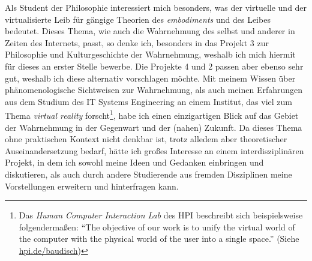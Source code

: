 \documentclass[a4paper]{article}
\begin{document}
Als Student der Philosophie interessiert mich besonders, was der virtuelle und der virtualisierte Leib für gängige Theorien des \emph{embodiments} und des Leibes bedeutet. Dieses Thema, wie auch die Wahrnehmung des selbst und anderer in Zeiten des Internets, passt, so denke ich, besonders in das Projekt 3 zur Philosophie und Kulturgeschichte der Wahrnehmung, weshalb ich mich hiermit für dieses an erster Stelle bewerbe. Die Projekte 4 und 2 passen aber ebenso sehr gut, weshalb ich diese alternativ vorschlagen möchte. Mit meinem Wissen über phänomenologische Sichtweisen zur Wahrnehmung, als auch meinen Erfahrungen aus dem Studium des IT Systems Engineering an einem Institut, das viel zum Thema \emph{virtual reality} forscht\footnote{Das \emph{Human Computer Interaction Lab} des HPI beschreibt sich beispielsweise folgendermaßen: "`The objective of our work is to unify the virtual world of the computer with the physical world of the user into a single space."' (Siehe \url{hpi.de/baudisch})}, habe ich einen einzigartigen Blick auf das Gebiet der Wahrnehmung in der Gegenwart und der (nahen) Zukunft. Da dieses Thema ohne praktischen Kontext nicht denkbar ist, trotz alledem aber theoretischer Auseinandersetzung bedarf, hätte ich großes Interesse an einem interdisziplinären Projekt, in dem ich sowohl meine Ideen und Gedanken einbringen und diskutieren, als auch durch andere Studierende aus fremden Disziplinen meine Vorstellungen erweitern und hinterfragen kann. 

\newpage
\nocite{*}
\printbibliography
\end{document}
